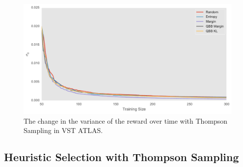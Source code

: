\begin{figure}[tbp]
	\centering
	\includegraphics[width=\textwidth]{figures/bandit_sigma_vst}
	\caption{The change in the variance of the reward over time with Thompson Sampling in VST ATLAS.}
	\label{fig:bandit_sigma_vst} 
\end{figure}

\subsection{Heuristic Selection with Thompson Sampling}

